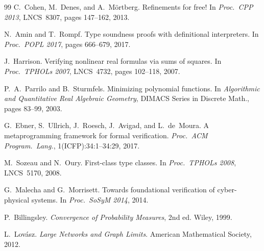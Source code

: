 \documentclass{article}
\begin{document}
\begin{thebibliography}{99}
C.~Cohen, M.~Denes, and A.~M\"{o}rtberg.
\newblock Refinements for free!
\newblock In \textit{Proc.\ CPP 2013}, LNCS~8307, pages 147--162, 2013.

N.~Amin and T.~Rompf.
\newblock Type soundness proofs with definitional interpreters.
\newblock In \textit{Proc.\ POPL 2017}, pages 666--679, 2017.

J.~Harrison.
\newblock Verifying nonlinear real formulas via sums of squares.
\newblock In \textit{Proc.\ TPHOLs 2007}, LNCS~4732, pages 102--118, 2007.

P.~A.~Parrilo and B.~Sturmfels.
\newblock Minimizing polynomial functions.
\newblock In \textit{Algorithmic and Quantitative Real Algebraic Geometry},
  DIMACS Series in Discrete Math., pages 83--99, 2003.

G.~Ebner, S.~Ullrich, J.~Roesch, J.~Avigad, and L.~de~Moura.
\newblock A metaprogramming framework for formal verification.
\newblock \textit{Proc.\ ACM Program.\ Lang.}, 1(ICFP):34:1--34:29, 2017.

M.~Sozeau and N.~Oury.
\newblock First-class type classes.
\newblock In \textit{Proc.\ TPHOLs 2008}, LNCS~5170, 2008.

G.~Malecha and G.~Morrisett.
\newblock Towards foundational verification of cyber-physical systems.
\newblock In \textit{Proc.\ SoSyM 2014}, 2014.

P.~Billingsley.
\newblock \textit{Convergence of Probability Measures}, 2nd ed.
\newblock Wiley, 1999.

L.~Lov\'{a}sz.
\newblock \textit{Large Networks and Graph Limits}.
\newblock American Mathematical Society, 2012.

\end{thebibliography}
\end{document}
